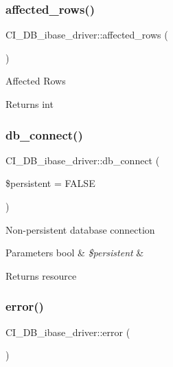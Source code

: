 \subsubsection{\texorpdfstring{affected\+\_\+rows()}{affected\_rows()}}
{\footnotesize\ttfamily C\+I\+\_\+\+D\+B\+\_\+ibase\+\_\+driver\+::affected\+\_\+rows (\begin{DoxyParamCaption}{ }\end{DoxyParamCaption})}

Affected Rows

\begin{DoxyReturn}{Returns}
int 
\end{DoxyReturn}
\mbox{\label{class_c_i___d_b__ibase__driver_a2158deef346899fc1bcaf3504eea920b}} 
\subsubsection{\texorpdfstring{db\+\_\+connect()}{db\_connect()}}
{\footnotesize\ttfamily C\+I\+\_\+\+D\+B\+\_\+ibase\+\_\+driver\+::db\+\_\+connect (\begin{DoxyParamCaption}\item[{}]{\$persistent = {\ttfamily FALSE} }\end{DoxyParamCaption})}

Non-\/persistent database connection


\begin{DoxyParams}[1]{Parameters}
bool & {\em \$persistent} & \\
\hline
\end{DoxyParams}
\begin{DoxyReturn}{Returns}
resource 
\end{DoxyReturn}
\mbox{\label{class_c_i___d_b__ibase__driver_aee3fd42c31a0a44ba04dcdf510a42fad}} 
\subsubsection{\texorpdfstring{error()}{error()}}
{\footnotesize\ttfamily C\+I\+\_\+\+D\+B\+\_\+ibase\+\_\+driver\+::error (\begin{DoxyParamCaption}{ }\end{DoxyParamCaption})}

